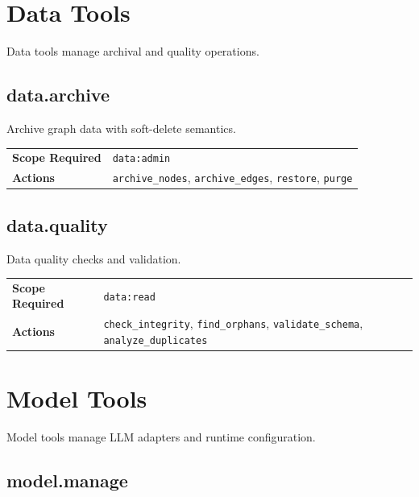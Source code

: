 \section{Data Tools}
\label{app:tools:data}

Data tools manage archival and quality operations.

\subsection{data.archive}

Archive graph data with soft-delete semantics.

\begin{table}[ht]
\centering
\small
\begin{tabularx}{\textwidth}{lX}
    \hline
    \textbf{Scope Required} & \texttt{data:admin} \\
    \textbf{Actions} & \texttt{archive\_nodes}, \texttt{archive\_edges}, \texttt{restore}, \texttt{purge} \\
    \hline
\end{tabularx}
\end{table}

\subsection{data.quality}

Data quality checks and validation.

\begin{table}[ht]
\centering
\small
\begin{tabularx}{\textwidth}{lX}
    \hline
    \textbf{Scope Required} & \texttt{data:read} \\
    \textbf{Actions} & \texttt{check\_integrity}, \texttt{find\_orphans}, \texttt{validate\_schema}, \texttt{analyze\_duplicates} \\
    \hline
\end{tabularx}
\end{table}

\section{Model Tools}
\label{app:tools:model}

Model tools manage LLM adapters and runtime configuration.

\subsection{model.manage}

